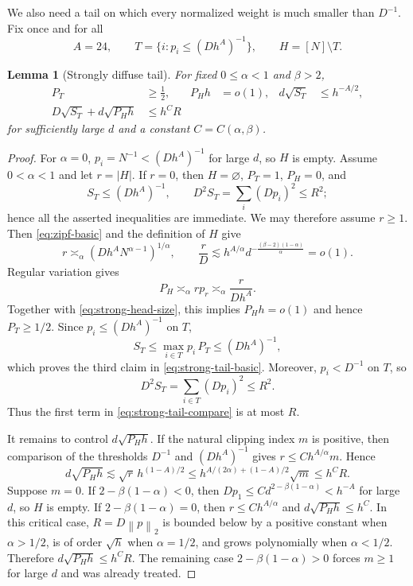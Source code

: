 \documentclass[11pt]{article}
\newtheorem{lemma}[theorem]{Lemma}
\theoremstyle{remark}
\newcommand{\norm}[1]{\left\lVert #1\right\rVert}
\newcommand{\1}{\mathbf 1}
\begin{document}
We also need a tail on which every normalized weight is much smaller
than $D^{-1}$.  Fix once and for all
\[
 A=24,
 \qquad
 T=\{i:p_i\leq(Dh^A)^{-1}\},
 \qquad
 H=[N]\setminus T.
\]

\begin{lemma}[Strongly diffuse tail]
\label{lem:strong-tail}
For fixed $0\leq\alpha<1$ and $\beta>2$,
\begin{align}
 P_T&\geq\frac12,
 &P_Hh&=o(1),
 &d\sqrt{S_T}&\leq h^{-A/2},
 \label{eq:strong-tail-basic}\\
 D\sqrt{S_T}+d\sqrt{P_Hh}&\leq h^C R
 \label{eq:strong-tail-compare}
\end{align}
for sufficiently large $d$ and a constant $C=C(\alpha,\beta)$.
\end{lemma}

\begin{proof}
For $\alpha=0$, $p_i=N^{-1}<(Dh^A)^{-1}$ for large $d$, so $H$ is
empty.  Assume $0<\alpha<1$ and let $r=|H|$.  If $r=0$, then
$H=\varnothing$, $P_T=1$, $P_H=0$, and
\[
 S_T\leq(Dh^A)^{-1},
 \qquad
 D^2S_T=\sum_i(Dp_i)^2\leq R^2;
\]
hence all the asserted inequalities are immediate.  We may therefore
assume $r\geq1$.  Then \eqref{eq:zipf-basic} and the definition of $H$
give
\begin{equation}
 r\asymp_\alpha(Dh^A N^{\alpha-1})^{1/\alpha},
 \qquad
 \frac rD\lesssim
 h^{A/\alpha}d^{-\frac{(\beta-2)(1-\alpha)}{\alpha}}=o(1).
 \label{eq:strong-head-size}
\end{equation}
Regular variation gives
\[
 P_H\asymp_\alpha r p_r\asymp_\alpha\frac{r}{Dh^A}.
\]
Together with \eqref{eq:strong-head-size}, this implies $P_Hh=o(1)$
and hence $P_T\geq1/2$.  Since $p_i\leq(Dh^A)^{-1}$ on $T$,
\[
 S_T\leq \max_{i\in T}p_i\,P_T\leq(Dh^A)^{-1},
\]
which proves the third claim in \eqref{eq:strong-tail-basic}.
Moreover, $p_i<D^{-1}$ on $T$, so
\[
 D^2S_T=\sum_{i\in T}(Dp_i)^2\leq R^2.
\]
Thus the first term in \eqref{eq:strong-tail-compare} is at most $R$.

It remains to control $d\sqrt{P_Hh}$.  If the natural clipping index
$m$ is positive, then comparison of the thresholds $D^{-1}$ and
$(Dh^A)^{-1}$ gives $r\leq C h^{A/\alpha}m$.  Hence
\[
 d\sqrt{P_Hh}
 \lesssim \sqrt r\,h^{(1-A)/2}
 \leq h^{A/(2\alpha)+(1-A)/2}\sqrt m
 \leq h^C R.
\]
Suppose $m=0$.  If $2-\beta(1-\alpha)<0$, then
$Dp_1\leq Cd^{2-\beta(1-\alpha)}<h^{-A}$ for large $d$, so $H$ is
empty.  If $2-\beta(1-\alpha)=0$, then $r\leq Ch^{A/\alpha}$ and
$d\sqrt{P_Hh}\leq h^C$.  In this critical case, $R=D\norm p_2$ is
bounded below by a positive constant when $\alpha>1/2$, is of order
$\sqrt h$ when $\alpha=1/2$, and grows polynomially when
$\alpha<1/2$.  Therefore $d\sqrt{P_Hh}\leq h^C R$.  The remaining
case $2-\beta(1-\alpha)>0$ forces $m\geq1$ for large $d$ and was
already treated.
\end{proof}
\end{document}
